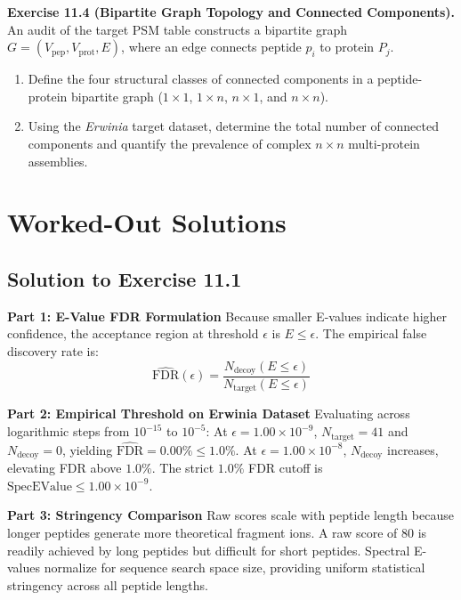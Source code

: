 \documentclass[11pt,twoside,openright]{book}
\begin{document}
\vspace{0.8em}
\noindent\textbf{Exercise 11.4 (Bipartite Graph Topology and Connected Components).}\enspace
\label{ex:connected_components_topology}
An audit of the target PSM table constructs a bipartite graph $G = (V_{\text{pep}}, V_{\text{prot}}, E)$, where an edge connects peptide $p_i$ to protein $P_j$.
\begin{enumerate}
    \item Define the four structural classes of connected components in a peptide-protein bipartite graph ($1 \times 1$, $1 \times n$, $n \times 1$, and $n \times n$).
    \item Using the \textit{Erwinia} target dataset, determine the total number of connected components and quantify the prevalence of complex $n \times n$ multi-protein assemblies.
\end{enumerate}

\section{Worked-Out Solutions}

\subsection{Solution to Exercise 11.1}

\noindent\textbf{Part 1: E-Value FDR Formulation}\enspace
Because smaller E-values indicate higher confidence, the acceptance region at threshold $\epsilon$ is $E \le \epsilon$. The empirical false discovery rate is:
\begin{equation}
\widehat{\text{FDR}}(\epsilon) = \frac{N_{\text{decoy}}(E \le \epsilon)}{N_{\text{target}}(E \le \epsilon)}
\end{equation}

\noindent\textbf{Part 2: Empirical Threshold on Erwinia Dataset}\enspace
Evaluating across logarithmic steps from $10^{-15}$ to $10^{-5}$:
At $\epsilon = 1.00 \times 10^{-9}$, $N_{\text{target}} = 41$ and $N_{\text{decoy}} = 0$, yielding $\widehat{\text{FDR}} = 0.00\% \le 1.0\%$.
At $\epsilon = 1.00 \times 10^{-8}$, $N_{\text{decoy}}$ increases, elevating FDR above $1.0\%$.
The strict $1.0\%$ FDR cutoff is $\text{SpecEValue} \le 1.00 \times 10^{-9}$.

\noindent\textbf{Part 3: Stringency Comparison}\enspace
Raw scores scale with peptide length because longer peptides generate more theoretical fragment ions. A raw score of 80 is readily achieved by long peptides but difficult for short peptides. Spectral E-values normalize for sequence search space size, providing uniform statistical stringency across all peptide lengths.
\end{document}
